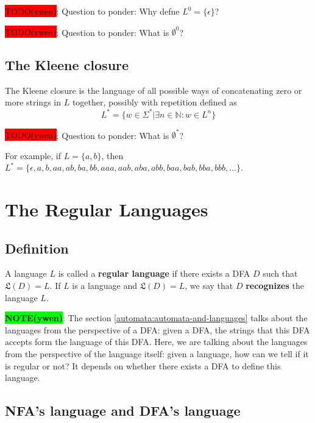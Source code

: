 \documentclass[12pt, letterpaper, oneside]{book}
\begin{document}
\colorbox{red}{TODO(ywen)}: Question to ponder: Why defne $L^0 = \{ \epsilon \}$?

\colorbox{red}{TODO(ywen)}: Question to ponder: What is $\emptyset^0$?

\subsection{The Kleene closure}

The Kleene closure is the language of all possible ways of concatenating zero or more strings in $L$ together, possibly
with repetition defined as \[ L^* = \{ w \in \Sigma^* | \exists n \in \mathbb{N}: w \in L^n \} \]

\colorbox{red}{TODO(ywen)}: Question to ponder: What is $\emptyset^*$?

For example, if $L = \{a, b\}$, then $L^* = \{ \epsilon, a, b, aa, ab, ba, bb, aaa, aab, aba, abb, baa, bab, bba, bbb,
  \ldots \}$.

\section{The Regular Languages}

\subsection{Definition}

A language $L$ is called a \textbf{regular language} if there exists a DFA $D$ such that $\mathfrak{L}(D) = L$.
If $L$ is a language and $\mathfrak{L}(D) = L$, we say that $D$ \textbf{recognizes} the language $L$.

\colorbox{lime}{\textbf{NOTE(ywen)}}: The section \ref{automata:automata-and-languages} talks about the languages from
the perspective of a DFA: given a DFA, the strings that this DFA accepts form the language of this DFA. Here, we are
talking about the languages from the perspective of the language itself: given a language, how can we tell if it is
regular or not? It depends on whether there exists a DFA to define this language.

\subsection{NFA's language and DFA's language}
\end{document}
